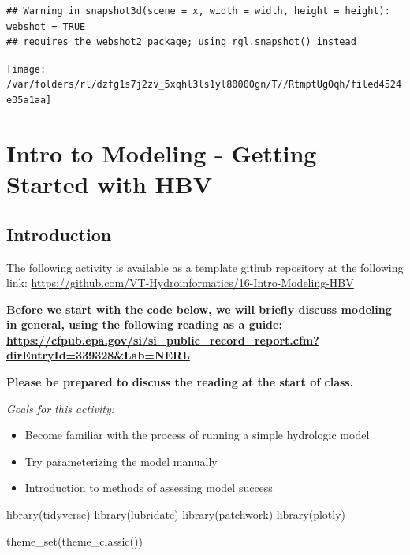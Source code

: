 \documentclass[
]{book}
\newenvironment{Shaded}{\begin{snugshade}}{\end{snugshade}}
\newcommand{\FunctionTok}[1]{\textcolor[rgb]{0.00,0.00,0.00}{#1}}
\newcommand{\NormalTok}[1]{#1}
\providecommand{\tightlist}{%
  \setlength{\itemsep}{0pt}\setlength{\parskip}{0pt}}
\begin{document}
\begin{verbatim}
## Warning in snapshot3d(scene = x, width = width, height = height): webshot = TRUE
## requires the webshot2 package; using rgl.snapshot() instead
\end{verbatim}

\texttt{[image: /var/folders/rl/dzfg1s7j2zv\_5xqhl3ls1yl80000gn/T//RtmptUgOqh/filed4524e35a1aa]}

\hypertarget{modelingintro}{%
\chapter{Intro to Modeling - Getting Started with HBV}\label{modelingintro}}

\hypertarget{introduction-4}{%
\section{Introduction}\label{introduction-4}}

The following activity is available as a template github repository at the following link: \url{https://github.com/VT-Hydroinformatics/16-Intro-Modeling-HBV}

\textbf{Before we start with the code below, we will briefly discuss modeling in general, using the following reading as a guide: \url{https://cfpub.epa.gov/si/si_public_record_report.cfm?dirEntryId=339328\&Lab=NERL}}

\textbf{Please be prepared to discuss the reading at the start of class.}

\emph{Goals for this activity:}

\begin{itemize}
\tightlist
\item
  Become familiar with the process of running a simple hydrologic model
\item
  Try parameterizing the model manually
\item
  Introduction to methods of assessing model success
\end{itemize}

\begin{Shaded}
\begin{Highlighting}[]
\FunctionTok{library}\NormalTok{(tidyverse)}
\FunctionTok{library}\NormalTok{(lubridate)}
\FunctionTok{library}\NormalTok{(patchwork)}
\FunctionTok{library}\NormalTok{(plotly)}

\FunctionTok{theme\_set}\NormalTok{(}\FunctionTok{theme\_classic}\NormalTok{())}
\end{Highlighting}
\end{Shaded}
\end{document}
